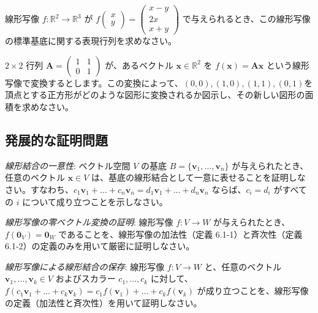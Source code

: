 \begin{quiz}
線形写像 $f: \mathbb{R}^2 \to \mathbb{R}^3$ が $f\begin{pmatrix} x \\ y \end{pmatrix} = \begin{pmatrix} x-y \\ 2x \\ x+y \end{pmatrix}$ で与えられるとき、この線形写像の標準基底に関する表現行列を求めなさい。
\end{quiz}

\begin{quiz}
$2 \times 2$ 行列 $\bm{A} = \begin{pmatrix} 1 & 1 \\ 0 & 1 \end{pmatrix}$ が、あるベクトル $\bm{x} \in \mathbb{R}^2$ を $f(\bm{x}) = \bm{A}\bm{x}$ という線形写像で変換するとします。この変換によって、$(0,0),(1,0),(1,1),(0,1)$を頂点とする正方形がどのような図形に変換されるか図示し、その新しい図形の面積を求めなさい。
\end{quiz}

\subsection{発展的な証明問題}

\begin{quiz}
\emph{線形結合の一意性}: ベクトル空間 $V$ の基底 $B = \{\bm{v}_1, \ldots, \bm{v}_n\}$ が与えられたとき、任意のベクトル $\bm{x} \in V$ は、基底の線形結合として一意に表せることを証明しなさい。すなわち、$c_1\bm{v}_1 + \dots + c_n\bm{v}_n = d_1\bm{v}_1 + \dots + d_n\bm{v}_n$ ならば、$c_i = d_i$ がすべての $i$ について成り立つことを示しなさい。
\end{quiz}

\begin{quiz}
\emph{線形写像の零ベクトル変換の証明}: 線形写像 $f:V \to W$ が与えられたとき、$f(\bm{0}_V) = \bm{0}_W$ であることを、線形写像の加法性（定義 6.1-1）と斉次性（定義 6.1-2）の定義のみを用いて厳密に証明しなさい。
\end{quiz}

\begin{quiz}
\emph{線形写像による線形結合の保存}: 線形写像 $f:V \to W$ と、任意のベクトル $\bm{v}_1, \ldots, \bm{v}_k \in V$ およびスカラー $c_1, \ldots, c_k$ に対して、$f(c_1\bm{v}_1 + \dots + c_k\bm{v}_k) = c_1 f(\bm{v}_1) + \dots + c_k f(\bm{v}_k)$ が成り立つことを、線形写像の定義（加法性と斉次性）を用いて証明しなさい。
\end{quiz}

